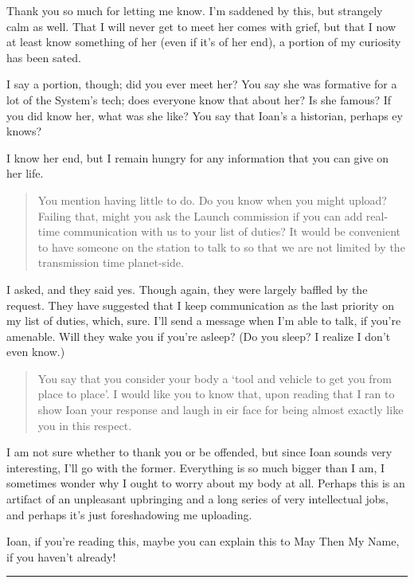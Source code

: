 \noindent Thank you so much for letting me know. I'm saddened by this, but strangely calm as well. That I will never get to meet her comes with grief, but that I now at least know something of her (even if it's of her end), a portion of my curiosity has been sated.

I say a portion, though; did you ever meet her? You say she was formative for a lot of the System's tech; does everyone know that about her? Is she famous? If you did know her, what was she like? You say that Ioan's a historian, perhaps ey knows?

I know her end, but I remain hungry for any information that you can give on her life.

\begin{quote}
You mention having little to do. Do you know when you might upload? Failing that, might you ask the Launch commission if you can add real-time communication with us to your list of duties? It would be convenient to have someone on the station to talk to so that we are not limited by the transmission time planet-side.
\end{quote}

\noindent I asked, and they said yes. Though again, they were largely baffled by the request. They have suggested that I keep communication as the last priority on my list of duties, which, sure. I'll send a message when I'm able to talk, if you're amenable. Will they wake you if you're asleep? (Do you sleep? I realize I don't even know.)

\begin{quote}
You say that you consider your body a `tool and vehicle to get you from place to place'. I would like you to know that, upon reading that I ran to show Ioan your response and laugh in eir face for being almost exactly like you in this respect.
\end{quote}

\noindent I am not sure whether to thank you or be offended, but since Ioan sounds very interesting, I'll go with the former. Everything is so much bigger than I am, I sometimes wonder why I ought to worry about my body at all. Perhaps this is an artifact of an unpleasant upbringing and a long series of very intellectual jobs, and perhaps it's just foreshadowing me uploading.

Ioan, if you're reading this, maybe you can explain this to May Then My Name, if you haven't already!

\begin{center}\rule{0.5\linewidth}{0.5pt}\end{center}


